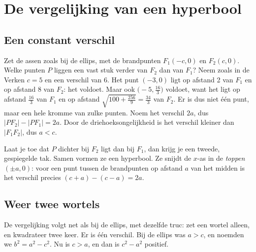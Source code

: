 \section{De vergelijking van een hyperbool}

\subsection{Een constant verschil}

Zet de assen zoals bij de ellips, met de brandpunten $F_1(-c, 0)$ en $F_2(c, 0)$. Welke punten $P$ liggen een vast stuk verder van $F_2$ dan van $F_1$? Neem zoals in de Verken $c = 5$ en een verschil van 6. Het punt $(-3, 0)$ ligt op afstand 2 van $F_1$ en op afstand 8 van $F_2$: het voldoet. Maar ook $\bigl(-5, \tfrac{16}{3}\bigr)$ voldoet, want het ligt op afstand $\tfrac{16}{3}$ van $F_1$ en op afstand $\sqrt{100 + \tfrac{256}{9}} = \tfrac{34}{3}$ van $F_2$. Er is dus niet één punt, maar een hele kromme van zulke punten. Noem het verschil $2a$, dus $|PF_2| - |PF_1| = 2a$. Door de driehoeksongelijkheid is het verschil kleiner dan $|F_1F_2|$, dus $a < c$.

Laat je toe dat $P$ dichter bij $F_2$ ligt dan bij $F_1$, dan krijg je een tweede, gespiegelde tak. Samen vormen ze een hyperbool. Ze snijdt de $x$-as in de \emph{toppen} $(\pm a, 0)$: voor een punt tussen de brandpunten op afstand $a$ van het midden is het verschil precies $(c + a) - (c - a) = 2a$.

\subsection{Weer twee wortels}

De vergelijking volgt net als bij de ellips, met dezelfde truc: zet een wortel alleen, en kwadrateer twee keer. Er is één verschil. Bij de ellips was $a > c$, en noemden we $b^2 = a^2 - c^2$. Nu is $c > a$, en dan is $c^2 - a^2$ positief.

